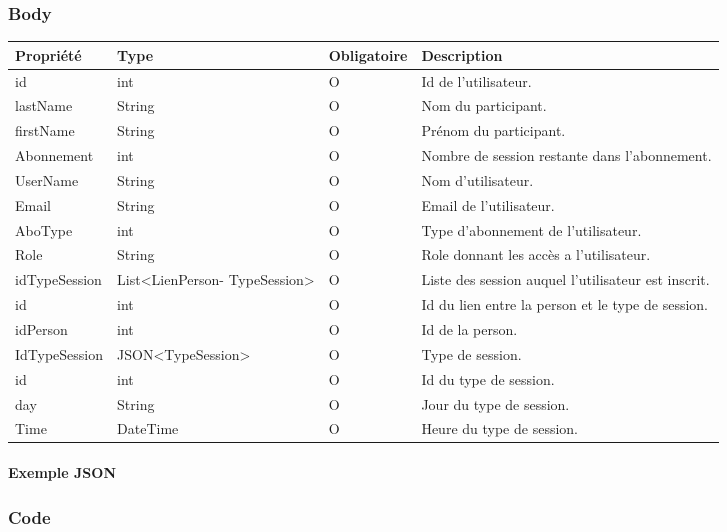 	\subsubsection{Body}
		\begin{center}
			\begin{tabularx}{\textwidth}{| T{0.2122\textwidth} | S{0.22\textwidth} | S{0.15\textwidth} | S{0.3\textwidth} |}
				\hline
				Propriété & Type & Obligatoire & Description \\
				\hline
				id & int & O & Id de l'utilisateur. \\
				\hline
				lastName & String & O & Nom du participant. \\
				\hline
				firstName & String & O & Prénom du participant. \\
				\hline
				Abonnement & int & O & Nombre de session restante dans l'abonnement. \\
				\hline
				UserName & String & O & Nom d'utilisateur. \\
				\hline
				Email & String & O & Email de l'utilisateur. \\
				\hline
				AboType & int & O & Type d'abonnement de l'utilisateur. \\
				\hline
				Role & String & O & Role donnant les accès a l'utilisateur. \\ 
				\hline
				idTypeSession & List<LienPerson- TypeSession> & O & Liste des session auquel l'utilisateur est inscrit. \\
				\hline
				
				\hline
				
				\hline
				id & int & O & Id du lien entre la person et le type de session. \\ 
				\hline
				idPerson & int & O & Id de la person. \\
				\hline
				IdTypeSession & JSON<TypeSession> & O & Type de session. \\
				\hline
				
				\hline
				
				\hline
				id & int & O & Id du type de session. \\
				\hline
				day & String & O & Jour du type de session. \\
				\hline
				Time & DateTime & O & Heure du type de session. \\
				\hline

			\end{tabularx}
		\end{center}
		
	\newpage
		\paragraph{Exemple JSON}
			\paragraph{}
			
			
			
	\subsubsection{Code}
		\paragraph{}
